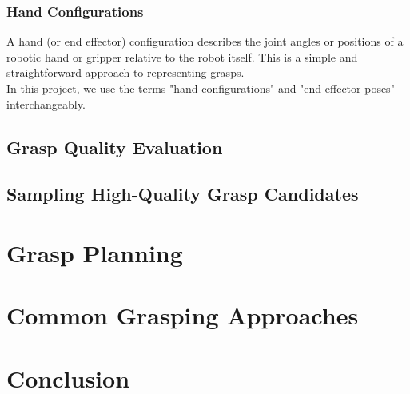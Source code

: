 \documentclass[12pt, a4paper]{report}
\theoremstyle{definition}
\begin{document}
\subsubsection{Hand Configurations}
\label{sec:2.1.1.3}
A hand (or end effector) configuration describes the joint angles or positions of a robotic hand or gripper relative to the robot itself. This is a simple and straightforward approach to representing grasps.\\

In this project, we use the terms "hand configurations" and "end effector poses" interchangeably.

\subsection{Grasp Quality Evaluation}
\label{sec:2.1.2}

\subsection{Sampling High-Quality Grasp Candidates}
\label{sec:2.1.3}

\section{Grasp Planning}
\label{sec:2.2}


\section{Common Grasping Approaches}
\label{sec:2.3}


\section{Conclusion}
\label{sec:2.4}


\end{document}
